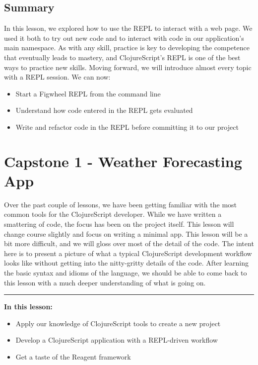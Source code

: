 \documentclass[10pt,twoside,openright]{memoir}
\begin{document}
\section{Summary}

In this lesson, we explored how to use the REPL to interact with a web
page. We used it both to try out new code and to interact with code in
our application's main namespace. As with any skill, practice is key to
developing the competence that eventually leads to mastery, and
ClojureScript's REPL is one of the best ways to practice new skills.
Moving forward, we will introduce almost every topic with a REPL
session. We can now:

\begin{itemize}
\tightlist
\item
  Start a Figwheel REPL from the command line
\item
  Understand how code entered in the REPL gets evaluated
\item
  Write and refactor code in the REPL before committing it to our
  project
\end{itemize}

\chapter{Capstone 1 - Weather Forecasting App}

Over the past couple of lessons, we have been getting familiar with the
most common tools for the ClojureScript developer. While we have written
a smattering of code, the focus has been on the project itself. This
lesson will change course slightly and focus on writing a minimal app.
This lesson will be a bit more difficult, and we will gloss over most of
the detail of the code. The intent here is to present a picture of what
a typical ClojureScript development workflow looks like without getting
into the nitty-gritty details of the code. After learning the basic
syntax and idioms of the language, we should be able to come back to
this lesson with a much deeper understanding of what is going on.

\begin{center}\rule{0.5\linewidth}{0.5pt}\end{center}

\textbf{In this lesson:}

\begin{itemize}
\tightlist
\item
  Apply our knowledge of ClojureScript tools to create a new project
\item
  Develop a ClojureScript application with a REPL-driven workflow
\item
  Get a taste of the Reagent framework
\end{itemize}
\end{document}
